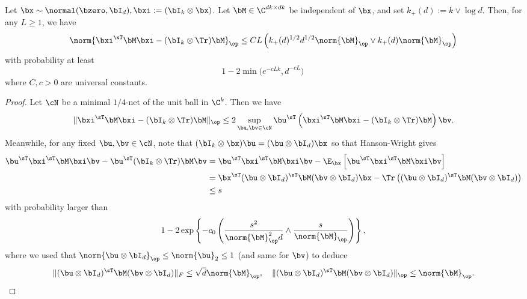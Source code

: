 \begin{lemma}
\label{lemma:hanson-wright}
Let $\bx \sim \normal(\bzero,\bI_d), \bxi := (\bI_k \otimes \bx)$.
   Let $\bM \in\C^{dk\times {dk}}$ be independent of $\bx$, and 
   set $k_+(d):= k\vee \log d$. Then,
   for any $L\ge 1$, we have
\begin{equation*}
    \norm{\bxi^\sT \bM  \bxi -  (\bI_k \otimes \Tr)\bM}_\op \le
     C L \left( k_+(d)^{1/2} d^{1/2} \norm{\bM}_\op \vee k_+(d) \norm{\bM}_\op \right)
\end{equation*}
with probability at least
\begin{equation*}
    1 - 2\min\Big(e^{-cLk}, d^{-cL}\Big)\,
\end{equation*}
where $C,c > 0$ are universal constants.
\end{lemma}

\begin{proof}
Let $\cN$ be a minimal $1/4$-net of the unit ball in $\C^k$.
Then we have
\begin{equation*}
   \|\bxi^\sT\bM \bxi - (\bI_k \otimes\Tr) \bM\|_\op \le
2 \sup_{\bu,\bv\in\cN}  \bu^\sT\left(\bxi^\sT\bM \bxi - (\bI_k \otimes\Tr) \bM\right)\bv.
\end{equation*}
Meanwhile, for any fixed $\bu,\bv\in\cN$, note that $(\bI_k\otimes\bx)\bu = (\bu \otimes\bI_d)\bx$ so that Hanson-Wright gives
    \begin{align*}
        \bu^\sT\bxi^\sT\bM\bxi\bv -  \bu^\sT(\bI_k \otimes \Tr)\bM\bv
        &=
        \bu^\sT\bxi^\sT\bM\bxi\bv -
\E_\bx\left[\bu^\sT\bxi^\sT\bM\bxi\bv \right]
        \\
        &= \bx^\sT(\bu \otimes\bI_d)^\sT \bM (\bv \otimes\bI_d) \bx
        - \Tr\left((\bu \otimes\bI_d)^\sT \bM (\bv \otimes\bI_d)\right) \\
        &\le s
    \end{align*}
with probability larger than 
\begin{equation*}
1 - 2\exp\left\{  -c_0\left(\frac{s^2}{\norm{\bM}_\op^2 d} \wedge 
\frac{s}{\norm{\bM}_\op}
\right)
\right\},
\end{equation*}
where we used that $\norm{\bu\otimes\bI_d}_\op \le \norm{\bu}_2 \le1$ (and same for $\bv$) to deduce
\begin{equation*}
    \|(\bu \otimes \bI_d)^\sT \bM (\bv\otimes \bI_d)\|_F \le 
     \sqrt{d}
\norm{\bM}_\op, \quad
    \|(\bu \otimes \bI_d)^\sT \bM (\bv\otimes \bI_d)\|_\op \le 
\norm{\bM}_\op.
\end{equation*}

\end{proof}
